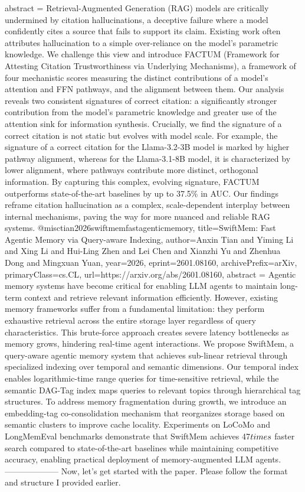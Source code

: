 {      abstract = {Retrieval-Augmented Generation (RAG) models are critically undermined by citation hallucinations, a deceptive failure where a model confidently cites a source that fails to support its claim. Existing work often attributes hallucination to a simple over-reliance on the model's parametric knowledge. We challenge this view and introduce FACTUM (Framework for Attesting Citation Trustworthiness via Underlying Mechanisms), a framework of four mechanistic scores measuring the distinct contributions of a model's attention and FFN pathways, and the alignment between them. Our analysis reveals two consistent signatures of correct citation: a significantly stronger contribution from the model's parametric knowledge and greater use of the attention sink for information synthesis. Crucially, we find the signature of a correct citation is not static but evolves with model scale. For example, the signature of a correct citation for the Llama-3.2-3B model is marked by higher pathway alignment, whereas for the Llama-3.1-8B model, it is characterized by lower alignment, where pathways contribute more distinct, orthogonal information. By capturing this complex, evolving signature, FACTUM outperforms state-of-the-art baselines by up to 37.5\% in AUC. Our findings reframe citation hallucination as a complex, scale-dependent interplay between internal mechanisms, paving the way for more nuanced and reliable RAG systems.}
}@misc{tian2026swiftmemfastagenticmemory,
      title={SwiftMem: Fast Agentic Memory via Query-aware Indexing}, 
      author={Anxin Tian and Yiming Li and Xing Li and Hui-Ling Zhen and Lei Chen and Xianzhi Yu and Zhenhua Dong and Mingxuan Yuan},
      year={2026},
      eprint={2601.08160},
      archivePrefix={arXiv},
      primaryClass={cs.CL},
      url={https://arxiv.org/abs/2601.08160},
      abstract = {Agentic memory systems have become critical for enabling LLM agents to maintain long-term context and retrieve relevant information efficiently. However, existing memory frameworks suffer from a fundamental limitation: they perform exhaustive retrieval across the entire storage layer regardless of query characteristics. This brute-force approach creates severe latency bottlenecks as memory grows, hindering real-time agent interactions. We propose SwiftMem, a query-aware agentic memory system that achieves sub-linear retrieval through specialized indexing over temporal and semantic dimensions. Our temporal index enables logarithmic-time range queries for time-sensitive retrieval, while the semantic DAG-Tag index maps queries to relevant topics through hierarchical tag structures. To address memory fragmentation during growth, we introduce an embedding-tag co-consolidation mechanism that reorganizes storage based on semantic clusters to improve cache locality. Experiments on LoCoMo and LongMemEval benchmarks demonstrate that SwiftMem achieves 47$\\times$ faster search compared to state-of-the-art baselines while maintaining competitive accuracy, enabling practical deployment of memory-augmented LLM agents.}
}
        --------------------
         Now, let's get started with the paper. Please follow the format and structure I provided earlier.

